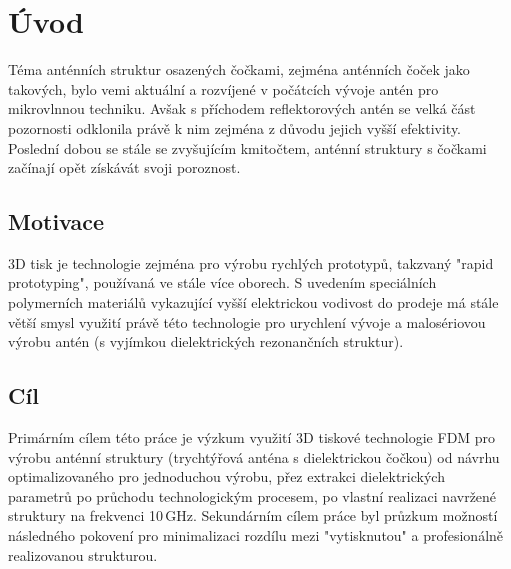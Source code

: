 \chapter{Úvod}
Téma anténních struktur osazených čočkami, zejména anténních čoček jako takových, bylo vemi aktuální a rozvíjené v počátcích vývoje antén pro mikrovlnnou techniku. Avšak s příchodem reflektorových antén se velká část pozornosti odklonila právě k nim zejména z důvodu jejich vyšší efektivity. Poslední dobou se stále se zvyšujícím kmitočtem, anténní struktury s čočkami začínají opět získávát svoji poroznost. \cite{ModernLens}

\section{Motivace}
3D tisk je technologie zejména pro výrobu rychlých prototypů, takzvaný "rapid prototyping", používaná ve stále více oborech. S uvedením speciálních polymerních materiálů vykazující vyšší elektrickou vodivost do prodeje má stále větší smysl využití právě této technologie pro urychlení vývoje a malosériovou výrobu antén (s vyjímkou dielektrických rezonančních struktur).

\section{Cíl}
Primárním cílem této práce je výzkum využití 3D tiskové technologie FDM pro výrobu anténní struktury (trychtýřová anténa s dielektrickou čočkou) od návrhu optimalizovaného pro jednoduchou výrobu, přez extrakci dielektrických parametrů po průchodu technologickým procesem, po vlastní realizaci navržené struktury na frekvenci 10\,GHz. Sekundárním cílem práce byl průzkum možností následného pokovení pro minimalizaci rozdílu mezi "vytisknutou" a profesionálně realizovanou strukturou.